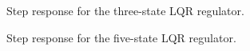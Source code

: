 \begin{figure}[h!]
    \centering
    \caption{Step response for the three-state LQR regulator.}
    \label{fig:LQR_3state}
\end{figure}



\begin{figure}[h]
    \centering
    \caption{Step response for the five-state LQR regulator.}
    \label{fig:LQR_5state}
\end{figure}